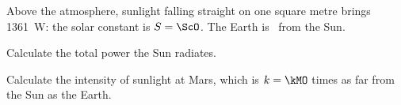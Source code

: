 Above the atmosphere, sunlight falling straight on one square metre brings \SI{1361}{\W}: the solar constant is $S = \ScO$. The Earth is \rEO\ from the Sun.

\begin{abcliste}
\abc Calculate the total power the Sun radiates.

\abc Calculate the intensity of sunlight at Mars, which is $k = \kMO$ times as far from the Sun as the Earth.
\end{abcliste}
